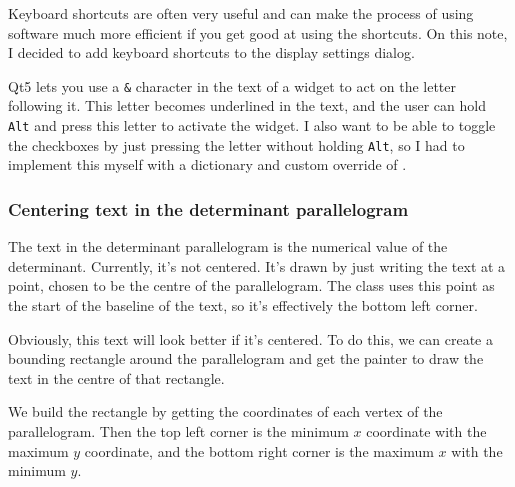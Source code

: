 \documentclass[../development.tex]{subfiles}
\begin{document}
Keyboard shortcuts are often very useful and can make the process of using software much more efficient if you get good at using the shortcuts. On this note, I decided to add keyboard shortcuts to the display settings dialog.

Qt5 lets you use a \texttt{\&} character in the text of a widget to act on the letter following it. This letter becomes underlined in the text, and the user can hold \texttt{Alt} and press this letter to activate the widget. I also want to be able to toggle the checkboxes by just pressing the letter without holding \texttt{Alt}, so I had to implement this myself with a dictionary and custom override of .


\subsubsection{Centering text in the determinant parallelogram\label{development:fixing-bugs-and-adding-polish:centering-text-in-the-determinant-parallelogram}}

The text in the determinant parallelogram is the numerical value of the determinant. Currently, it's not centered. It's drawn by just writing the text at a point, chosen to be the centre of the parallelogram. The  class uses this point as the start of the baseline of the text, so it's effectively the bottom left corner.


Obviously, this text will look better if it's centered. To do this, we can create a bounding rectangle around the parallelogram and get the painter to draw the text in the centre of that rectangle.

We build the rectangle by getting the coordinates of each vertex of the parallelogram. Then the top left corner is the minimum $x$ coordinate with the maximum $y$ coordinate, and the bottom right corner is the maximum $x$ with the minimum $y$.

\end{document}
